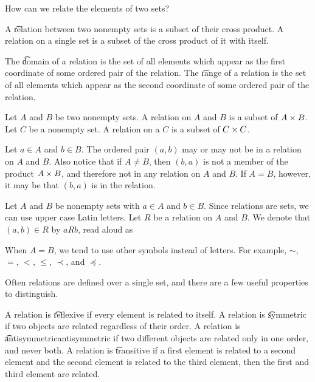 
\sbasic











\sstart
{}


How can we relate the elements of two sets?


A \t{relation} between two nonempty sets is a subset of their cross product.
A relation on a single set is a subset of the cross product of it with itself.

The \t{domain} of a relation is the set of all elements which appear as the first coordinate of some ordered pair of the relation.
The \t{range} of a relation is the set of all elements which appear as the second coordinate of some ordered pair of the relation.


Let $A$ and $B$ be two nonempty sets.
A relation on $A$ and $B$ is a subset of $A \times B$.
Let $C$ be a nonempty set.
A relation on a $C$ is a subset of $C \times C$.

Let $a \in A$ and $b \in B$.
The ordered pair $(a, b)$ may or may not be in a relation on $A$ and $B$.
Also notice that if $A \neq B$, then $(b, a)$ is not a member of the product $A \times B$, and therefore not in any relation on $A$ and $B$.
If $A = B$, however, it may be that $(b, a)$ is in the relation.


Let $A$ and $B$ be nonempty sets
with $a \in A$ and $b \in B$.
Since relations are sets,
we can use upper case Latin letters.
Let $R$ be a relation on $A$ and $B$.
We denote that $(a, b) \in R$ by
$a R b$, read aloud as

When $A = B$, we tend to use other symbols instead of letters.
For example,
$\sim$, $=$, $<$,
$\leq$, $\prec$, and $\preceq$.


Often relations are defined over a single set, and there are a few useful properties to distinguish.

A relation is \t{reflexive} if every element is related to itself.
A relation is \t{symmetric} if two objects are related regardless of their order.
A relation is \t{antisymmetric}{antisymmetric} if two different objects are related only in one order, and never both.
A relation is \t{transitive} if a first element is related to a second element and the second element is related to the third element, then the first and third element are related.

